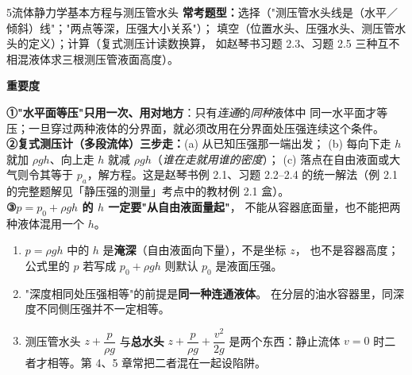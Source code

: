 \begin{kaodian}{5}{流体静力学基本方程与测压管水头}
\textbf{常考题型：}选择（"测压管水头线是（水平／倾斜）线"；"两点等深，压强大小关系"）；
填空（位置水头、压强水头、测压管水头的定义）；计算（复式测压计读数换算，
如赵琴书习题 2.3、习题 2.5 三种互不相混液体求三根测压管液面高度）。

\textbf{重要度 }\quad{}\quad{}

\begin{banfa}
\textbf{①"水平面等压"只用一次、用对地方}：只有\emph{连通}的\emph{同种}液体中
同一水平面才等压；一旦穿过两种液体的分界面，就必须改用在分界面处压强连续这个条件。\\
\textbf{②复式测压计（多段流体）三步走：}(a) 从已知压强那一端出发；
(b) 每向下走 $h$ 就加 $\rho g h$、向上走 $h$ 就减 $\rho g h$（\emph{谁在走就用谁的密度}）；
(c) 落点在自由液面或大气则令其等于 $p_a$，解方程。这是赵琴书例 2.1、习题 2.2--2.4 的统一解法（例 2.1 的完整题解见「静压强的测量」考点中的教材例 2.1 盒）。\\
\textbf{③$p=p_0+\rho g h$ 的 $h$ 一定要"从自由液面量起"}，
不能从容器底面量，也不能把两种液体混用一个 $h$。
\end{banfa}

\begin{yicuo}
\begin{enumerate}
\item $p=\rho g h$ 中的 $h$ 是\textbf{淹深}（自由液面向下量），不是坐标 $z$，
  也不是容器高度；公式里的 $p$ 若写成 $p_0+\rho g h$ 则默认 $p_0$ 是液面压强。\\
\item "深度相同处压强相等"的前提是\textbf{同一种连通液体}。
  在分层的油水容器里，同深度不同侧压强并不一定相等。\\
\item 测压管水头 $z+\dfrac{p}{\rho g}$ 与\textbf{总水头} $z+\dfrac{p}{\rho g}+\dfrac{v^2}{2g}$
  是两个东西：静止流体 $v=0$ 时二者才相等。第 4、5 章常把二者混在一起设陷阱。
\end{enumerate}
\end{yicuo}
\end{kaodian}

